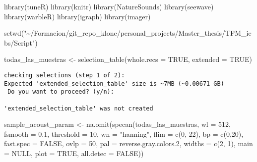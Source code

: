 \documentclass[
]{article}
\newenvironment{Shaded}{\begin{snugshade}}{\end{snugshade}}
\newcommand{\AttributeTok}[1]{\textcolor[rgb]{0.77,0.63,0.00}{#1}}
\newcommand{\ConstantTok}[1]{\textcolor[rgb]{0.00,0.00,0.00}{#1}}
\newcommand{\DecValTok}[1]{\textcolor[rgb]{0.00,0.00,0.81}{#1}}
\newcommand{\FloatTok}[1]{\textcolor[rgb]{0.00,0.00,0.81}{#1}}
\newcommand{\FunctionTok}[1]{\textcolor[rgb]{0.00,0.00,0.00}{#1}}
\newcommand{\NormalTok}[1]{#1}
\newcommand{\OtherTok}[1]{\textcolor[rgb]{0.56,0.35,0.01}{#1}}
\newcommand{\StringTok}[1]{\textcolor[rgb]{0.31,0.60,0.02}{#1}}
\begin{document}
\begin{Shaded}
\begin{Highlighting}[]
\FunctionTok{library}\NormalTok{(tuneR)}
\FunctionTok{library}\NormalTok{(knitr)}
\FunctionTok{library}\NormalTok{(NatureSounds)}
\FunctionTok{library}\NormalTok{(seewave)}
\FunctionTok{library}\NormalTok{(warbleR) }
\FunctionTok{library}\NormalTok{(igraph) }
\FunctionTok{library}\NormalTok{(imager) }
\end{Highlighting}
\end{Shaded}

\begin{Shaded}
\begin{Highlighting}[]
\FunctionTok{setwd}\NormalTok{(}\StringTok{"\textasciitilde{}/Formacion/git\_repo\_klone/personal\_projects/Master\_thesis/TFM\_iebs/Script"}\NormalTok{)}

\NormalTok{todas\_las\_muestras }\OtherTok{\textless{}{-}} \FunctionTok{selection\_table}\NormalTok{(}\AttributeTok{whole.recs =} \ConstantTok{TRUE}\NormalTok{, }\AttributeTok{extended =} \ConstantTok{TRUE}\NormalTok{)}
\end{Highlighting}
\end{Shaded}

\begin{verbatim}
checking selections (step 1 of 2):
Expected 'extended_selection_table' size is ~7MB (~0.00671 GB) 
 Do you want to proceed? (y/n): 

'extended_selection_table' was not created
\end{verbatim}

\begin{Shaded}
\begin{Highlighting}[]
\NormalTok{sample\_acoust\_param }\OtherTok{\textless{}{-}} \FunctionTok{na.omit}\NormalTok{(}\FunctionTok{specan}\NormalTok{(todas\_las\_muestras, }\AttributeTok{wl =} \DecValTok{512}\NormalTok{, }\AttributeTok{fsmooth =} \FloatTok{0.1}\NormalTok{, }
                                      \AttributeTok{threshold =} \DecValTok{10}\NormalTok{, }\AttributeTok{wn =} \StringTok{"hanning"}\NormalTok{,}
                                      \AttributeTok{flim =} \FunctionTok{c}\NormalTok{(}\DecValTok{0}\NormalTok{, }\DecValTok{22}\NormalTok{), }\AttributeTok{bp =} \FunctionTok{c}\NormalTok{(}\DecValTok{0}\NormalTok{,}\DecValTok{20}\NormalTok{), }
                                      \AttributeTok{fast.spec =} \ConstantTok{FALSE}\NormalTok{, }\AttributeTok{ovlp =} \DecValTok{50}\NormalTok{, }
                                      \AttributeTok{pal =}\NormalTok{ reverse.gray.colors}\FloatTok{.2}\NormalTok{,}
                                      \AttributeTok{widths =} \FunctionTok{c}\NormalTok{(}\DecValTok{2}\NormalTok{, }\DecValTok{1}\NormalTok{), }\AttributeTok{main =} \ConstantTok{NULL}\NormalTok{, }
                                      \AttributeTok{plot =} \ConstantTok{TRUE}\NormalTok{, }\AttributeTok{all.detec =} \ConstantTok{FALSE}\NormalTok{)) }
\end{Highlighting}
\end{Shaded}
\end{document}
